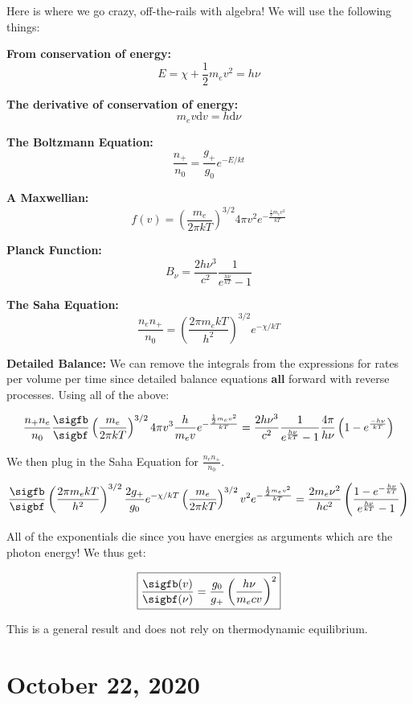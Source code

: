 \documentclass{article}
\newcommand{\planck}{\frac{2h\nu^3}{c^2} \frac{1}{e^{\frac{h\nu}{kT}} - 1}}
\begin{document}
Here is where we go crazy, off-the-rails with algebra! We will use the following things:

\textbf{From conservation of energy:}
$$
E = \chi + \frac12 m_e v^2 = h\nu
$$

\textbf{The derivative of conservation of energy:}
$$
m_e v \mathrm{d}v = h \mathrm{d} \nu
$$

\textbf{The Boltzmann Equation:}
$$
\frac{n_+}{n_0} = \frac{g_+}{g_0} e^{-E/kt}
$$

\textbf{A Maxwellian:}
$$
f(v) = \left(\frac{m_e}{2\pi kT}\right)^{3/2} 4 \pi v^2 e^{-\frac{\frac12 m_e v^2}{kT}}
$$

\textbf{Planck Function:}
$$
B_\nu = \planck
$$

\textbf{The Saha Equation:}
$$
\frac{n_e n_+}{n_0} = \left(\frac{2\pi m_e kT}{h^2}\right)^{3/2} e^{-\chi/kT}
$$

\textbf{Detailed Balance:}
We can remove the integrals from the expressions for rates per volume per time since detailed balance equations \textbf{all} forward with reverse processes. Using all of the above:

$$
\frac{n_+ n_e}{n_0} \frac{\sigfb}{\sigbf} \left(\frac{m_e}{2\pi kT}\right)^{3/2} 4 \pi v^3 \frac{h}{m_e v} e^{-\frac{\frac12 m_e v^2}{kT}} = \planck \frac{4\pi}{h \nu} \left(1 - e^{\frac{-h\nu}{kT}}\right)
$$

We then plug in the Saha Equation for $\frac{n_e n_+}{n_0}$.

$$
\frac{\sigfb}{\sigbf} \left(\frac{2\pi m_e kT}{h^2}\right)^{3/2} \frac{2g_+}{g_0} e^{-\chi/kT} \left(\frac{m_e}{2\pi kT}\right)^{3/2} v^2 e^{-\frac{\frac12 m_e v^2}{kT}} = \frac{2m_e \nu^2}{hc^2} \left(\frac{1-e^{-\frac{h\nu}{kT}}}{e^{\frac{h\nu}{kT}} - 1}\right)
$$

All of the exponentials die since you have energies as arguments which are the photon energy! We thus get:

$$
\boxed{\frac{\sigfb(v)}{\sigbf(\nu)} = \frac{g_0}{g_+}\left(\frac{h\nu}{m_e  c v}\right)^{2}}
$$

This is a general result and does not rely on thermodynamic equilibrium. 




\newpage
\section{October 22, 2020}
\end{document}
